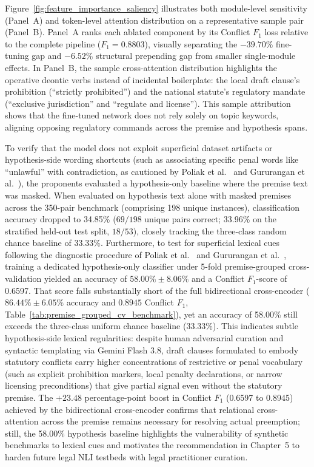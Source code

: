 Figure~\ref{fig:feature_importance_saliency} illustrates both module-level sensitivity (Panel~A) and token-level attention distribution on a representative sample pair (Panel~B). Panel~A ranks each ablated component by its Conflict $F_1$ loss relative to the complete pipeline ($F_1 = 0.8803$), visually separating the $-39.70\%$ fine-tuning gap and $-6.52\%$ structural prepending gap from smaller single-module effects. In Panel~B, the sample cross-attention distribution highlights the operative deontic verbs instead of incidental boilerplate: the local draft clause's prohibition (``strictly prohibited'') and the national statute's regulatory mandate (``exclusive jurisdiction'' and ``regulate and license''). This sample attribution shows that the fine-tuned network does not rely solely on topic keywords, aligning opposing regulatory commands across the premise and hypothesis spans.

\label{sec:hypothesis_only_baseline}
To verify that the model does not exploit superficial dataset artifacts or hypothesis-side wording shortcuts (such as associating specific penal words like ``unlawful'' with contradiction, as cautioned by Poliak et al.~\cite{poliak2018hypothesis} and Gururangan et al.~\cite{gururangan2018annotation}), the proponents evaluated a hypothesis-only baseline where the premise text was masked. When evaluated on hypothesis text alone with masked premises across the 350-pair benchmark (comprising 198 unique instances), classification accuracy dropped to 34.85\% ($69/198$ unique pairs correct; 33.96\% on the stratified held-out test split, $18/53$), closely tracking the three-class random chance baseline of 33.33\%. Furthermore, to test for superficial lexical cues following the diagnostic procedure of Poliak et al.~\cite{poliak2018hypothesis} and Gururangan et al.~\cite{gururangan2018annotation}, training a dedicated hypothesis-only classifier under 5-fold premise-grouped cross-validation yielded an accuracy of $58.00\% \pm 8.06\%$ and a Conflict $F_1$-score of 0.6597. That score falls substantially short of the full bidirectional cross-encoder ($86.44\% \pm 6.05\%$ accuracy and $0.8945$ Conflict $F_1$, Table~\ref{tab:premise_grouped_cv_benchmark}), yet an accuracy of 58.00\% still exceeds the three-class uniform chance baseline (33.33\%). This indicates subtle hypothesis-side lexical regularities: despite human adversarial curation and syntactic templating via Gemini Flash 3.8, draft clauses formulated to embody statutory conflicts carry higher concentrations of restrictive or penal vocabulary (such as explicit prohibition markers, local penalty declarations, or narrow licensing preconditions) that give partial signal even without the statutory premise. The $+23.48$ percentage-point boost in Conflict $F_1$ (0.6597 to 0.8945) achieved by the bidirectional cross-encoder confirms that relational cross-attention across the premise remains necessary for resolving actual preemption; still, the 58.00\% hypothesis baseline highlights the vulnerability of synthetic benchmarks to lexical cues and motivates the recommendation in Chapter~5 to harden future legal NLI testbeds with legal practitioner curation.


